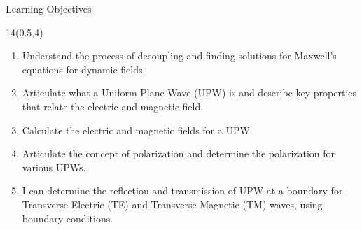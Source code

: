 
\begin{frame}{Learning Objectives}
	\begin{textblock}{14}(0.5,4)
	\begin{enumerate}[{9}.1]
		\item Understand the process of decoupling and finding solutions for Maxwell's equations for dynamic fields. 
		\item Articulate what a Uniform Plane Wave (UPW) is and describe key properties that relate the electric and magnetic field. 
		\item Calculate the electric and magnetic fields for a UPW.
		\item Articulate the concept of polarization and determine the polarization for various UPWs.
		\item I can determine the reflection and transmission of UPW at a boundary for Transverse Electric (TE) and Transverse Magnetic (TM) waves, using boundary conditions.
	\end{enumerate}
	\end{textblock}
\end{frame}

\begin{lesson32}
\end{lesson32}

